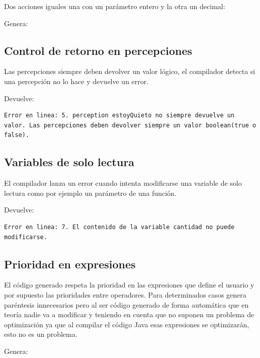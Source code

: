 \documentclass[11pt]{article}
\begin{document}
Dos acciones iguales una con un parámetro entero y la otra un decimal:


Genera:


\subsection{Control de retorno en percepciones}
Las percepciones siempre deben devolver un valor lógico, el compilador detecta si una percepción no lo hace y devuelve un error.



Devuelve:
\begin{lstlisting}
Error en linea: 5. perception estoyQuieto no siempre devuelve un valor. Las percepciones deben devolver siempre un valor boolean(true o false).
\end{lstlisting}


\subsection{Variables de solo lectura}
El compilador lanza un error cuando intenta modificarse una variable de solo lectura como por ejemplo un parámetro de una función.



Devuelve:
\begin{lstlisting}[style=J]
Error en linea: 7. El contenido de la variable cantidad no puede modificarse.
\end{lstlisting}


\subsection{Prioridad en expresiones}
El código generado respeta la prioridad en las expresiones que define el usuario y por supuesto las prioridades entre
operadores. Para determinados casos genera paréntesis innecesarios pero al ser código generado de forma automática que
en teoría nadie va a modificar y teniendo en cuenta que no suponen un problema de optimización ya que al compilar el código
 Java esas expresiones se optimizarán, esto no es un problema.



Genera:

\end{document}
